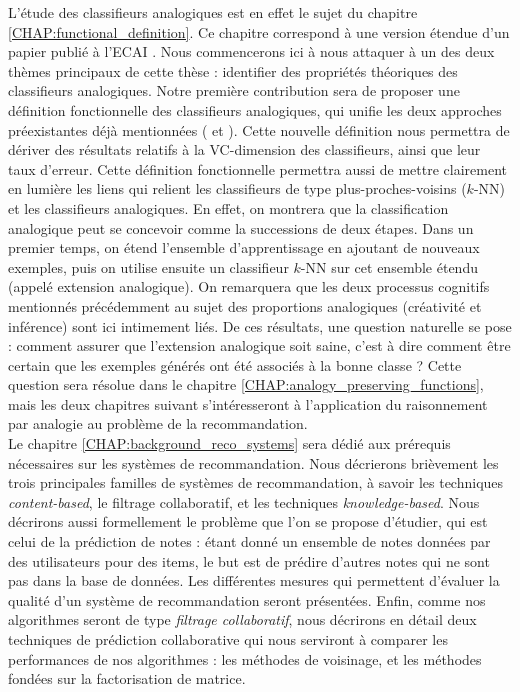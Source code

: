 L'étude des classifieurs analogiques est en effet le sujet du chapitre
\ref{CHAP:functional_definition}. Ce chapitre correspond à une version étendue
d'un papier publié à l'ECAI \cite{HugPraRicSerECAI16}. Nous commencerons ici à
nous attaquer à un des deux thèmes principaux de cette thèse : identifier des
propriétés théoriques des classifieurs analogiques. Notre première contribution
sera de proposer une définition fonctionnelle des classifieurs analogiques, qui
unifie les deux approches préexistantes déjà mentionnées (\cite{StrYvoCNLL05}
et \cite{BayMicDelIJCAI07}). Cette nouvelle définition nous permettra de
dériver des résultats relatifs à la VC-dimension des classifieurs, ainsi que
leur taux d'erreur. Cette définition fonctionnelle permettra aussi de mettre
clairement en lumière les liens qui relient les classifieurs de type
plus-proches-voisins ($k$-NN) et les classifieurs analogiques. En effet, on
montrera que la classification analogique peut se concevoir comme la
successions de deux étapes. Dans un premier temps, on étend l'ensemble
d'apprentissage  en ajoutant de nouveaux exemples, puis on utilise ensuite un
classifieur $k$-NN sur cet ensemble étendu (appelé extension analogique). On
remarquera que les deux processus cognitifs mentionnés précédemment au
sujet des proportions analogiques (créativité et inférence) sont ici intimement
liés. De ces résultats, une question naturelle se pose : comment assurer que
l'extension analogique soit saine, c'est à dire comment être certain que les
exemples générés ont été associés à la bonne classe ? Cette question sera
résolue dans le chapitre \ref{CHAP:analogy_preserving_functions}, mais les deux
chapitres suivant s'intéresseront à l'application du raisonnement par analogie
au problème de la recommandation.\\


Le chapitre  \ref{CHAP:background_reco_systems} sera dédié aux prérequis
nécessaires sur les systèmes de recommandation. Nous décrierons brièvement les
trois principales familles de systèmes de recommandation, à savoir les
techniques \textit{content-based}, le filtrage collaboratif, et les techniques
\textit{knowledge-based}. Nous décrirons aussi formellement le problème que
l'on se propose d'étudier, qui est celui de la prédiction de notes : étant
donné un ensemble de notes données par des utilisateurs pour des items, le but
est de prédire d'autres notes qui ne sont pas dans la base de données. Les
différentes mesures qui permettent d'évaluer la qualité d'un système de
recommandation seront présentées. Enfin, comme nos algorithmes seront de type
\textit{filtrage collaboratif}, nous décrirons en détail deux techniques de
prédiction collaborative qui nous serviront à comparer les performances de nos
algorithmes : les méthodes de voisinage, et les méthodes fondées sur la
factorisation de matrice.\\


